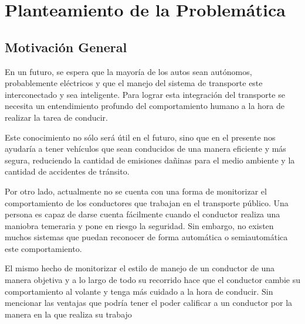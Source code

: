 
\chapter{Planteamiento de la Problemática}  %

\ifpdf
    \graphicspath{{Chapter1/Figs/Raster/}{Chapter1/Figs/PDF/}{Chapter1/Figs/}}
\else
    \graphicspath{{Chapter1/Figs/Vector/}{Chapter1/Figs/}}
\fi


\section{Motivación General}

En un futuro, se espera que la mayoría de los autos sean autónomos, probablemente eléctricos y que el manejo del sistema de transporte este interconectado y sea inteligente. Para lograr esta integración del transporte se necesita un entendimiento profundo del comportamiento humano a la hora de realizar la tarea de conducir.

Este conocimiento no sólo será útil en el futuro, sino que en el presente nos ayudaría a tener vehículos que sean conducidos de una manera eficiente y más segura, reduciendo  la cantidad de emisiones dañinas para el medio ambiente y la cantidad de accidentes de tránsito.

Por otro lado, actualmente no se cuenta con una forma de monitorizar el comportamiento de los conductores que trabajan en el transporte público. Una persona es capaz de darse cuenta fácilmente cuando el conductor realiza una maniobra temeraria y pone en riesgo la seguridad. Sin embargo, no existen muchos sistemas que puedan reconocer de forma automática o semiautomática este comportamiento.

El  mismo hecho de monitorizar el estilo de manejo de un conductor de una manera objetiva y a lo largo de todo su recorrido hace que el conductor cambie su comportamiento al volante y tenga más cuidado a la hora de conducir. Sin mencionar las ventajas que podría tener el poder calificar a un conductor por la manera en la que realiza su trabajo

